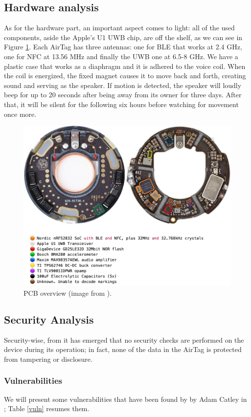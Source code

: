 \documentclass[english]{article}
\begin{document}
\subsection{Hardware analysis}\label{hw}
As for the hardware part, an important aspect comes to light: all of the used components, aside the Apple's U1 UWB chip, are off the shelf, as we can see in Figure \ref{img:pcb}.
Each AirTag has three antennas: one for BLE that works at 2.4 GHz, one for NFC at 13.56 MHz and finally the UWB one at 6.5-8 GHz.
We have a plastic case that works as a diaphragm and it is adhered to the voice coil. When the coil is energized, the fixed magnet causes it to move back and forth, creating sound and serving as the speaker.
If motion is detected, the speaker will loudly beep for up to 20 seconds after being away from its owner for three days. After that, it will be silent for the following six hours before watching for movement once more.
\begin{figure}[ht]
	\centering
	\includegraphics[width=\textwidth]{images/pcb.png}
	\caption{PCB overview (image from \cite{reverse}). }
	\label{img:pcb}
\end{figure}

\subsection{Security Analysis}\label{sec}
Security-wise, from \cite{reverse} it has emerged that no security checks are performed on the device during its operation; in fact, none of the data in the AirTag is protected from tampering or disclosure.
\subsubsection{Vulnerabilities}\label{sec:vuln}
We will present some vulnerabilities that have been found by by Adam Catley in \cite{reverse}; Table \ref{vuln} resumes them.
\end{document}
